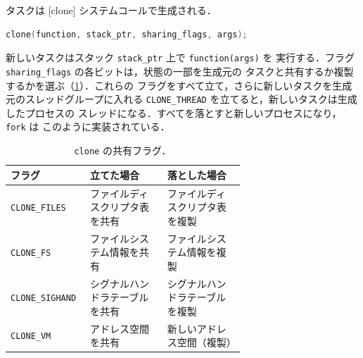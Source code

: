 \documentclass[../main.tex]{subfiles}
\begin{document}
タスクは [clone] システムコールで生成される．
\begin{lstlisting}[language=C, numbers=none]
clone(function, stack_ptr, sharing_flags, args);
\end{lstlisting}
新しいタスクはスタック \texttt{stack\_ptr} 上で \texttt{function(args)} を
実行する．フラグ \texttt{sharing\_flags} の各ビットは，状態の一部を生成元の
タスクと共有するか複製するかを選ぶ（\cref{tab:l05-clone}）．これらの
フラグをすべて立て，さらに新しいタスクを生成元のスレッドグループに入れる
\texttt{CLONE\_THREAD} を立てると，新しいタスクは生成したプロセスの
スレッドになる．すべてを落とすと新しいプロセスになり，\texttt{fork} は
このように実装されている．

\begin{table}[htbp]
  \centering
  \caption{\texttt{clone} の共有フラグ．}
  \label{tab:l05-clone}
  \small
  \begin{tabular}{@{}l>{\raggedright\arraybackslash}p{0.33\linewidth}>{\raggedright\arraybackslash}p{0.33\linewidth}@{}}
    \toprule
    フラグ & 立てた場合 & 落とした場合 \\
    \midrule
    \texttt{CLONE\_FILES}   & ファイルディスクリプタ表を共有
                            & ファイルディスクリプタ表を複製 \\
    \texttt{CLONE\_FS}      & ファイルシステム情報を共有
                            & ファイルシステム情報を複製 \\
    \texttt{CLONE\_SIGHAND} & シグナルハンドラテーブルを共有
                            & シグナルハンドラテーブルを複製 \\
    \texttt{CLONE\_VM}      & アドレス空間を共有
                            & 新しいアドレス空間（複製） \\
    \bottomrule
  \end{tabular}
\end{table}
\end{document}
